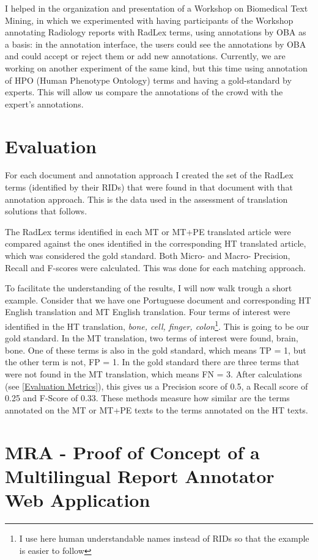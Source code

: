 I helped in the organization and presentation of a Workshop on Biomedical Text Mining, in which we experimented with having participants of the Workshop annotating Radiology reports with RadLex terms, using annotations by OBA as a basis: in the annotation interface, the users could see the annotations by OBA and could accept or reject them or add new annotations. Currently, we are working on another experiment of the same kind, but this time using annotation of HPO (Human Phenotype Ontology) terms and having a gold-standard by experts. This will allow us compare the annotations of the crowd with the expert's annotations.


\section{Evaluation}

For each document and annotation approach I created the set of the RadLex terms (identified by their RIDs) that were found in that document with that annotation approach. This is the data used in the assessment of translation solutions that follows.

The RadLex terms identified in each MT or MT+PE translated article were compared against the ones identified in the corresponding HT translated article, which was considered the gold standard. Both Micro- and Macro- Precision, Recall and F-scores were calculated. This was done for each matching approach. 

To facilitate the understanding of the results, I will now walk trough a short example. Consider that we have one Portuguese document and corresponding HT English translation and MT English translation. Four terms of interest were identified in the HT translation, \emph{bone, cell, finger, colon}\footnote{I use here human understandable names instead of RIDs so that the example is easier to follow}. This is going to be our gold standard. In the MT translation, two terms of interest were found, {brain, bone}. One of these terms is also in the gold standard, which means TP = 1, but the other term is not, FP = 1. In the gold standard there are three terms that were not found in the MT translation, which means FN = 3. After calculations (see \ref{Evaluation Metrics}), this gives us a Precision score of 0.5, a Recall score of 0.25 and F-Score of 0.33. These methods measure how similar are the terms annotated on the MT or MT+PE texts to the terms annotated on the HT texts.


\section{MRA - Proof of Concept of a Multilingual Report Annotator Web Application}


